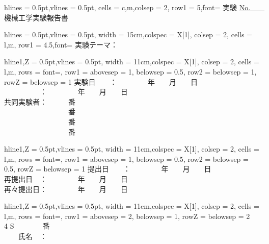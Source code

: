 
\begin{titlepage}
\begin{center}
\begin{tblr}{
  hlines = {0.5pt},vlines = {0.5pt},
  cells = {c,m},colsep = {2\zw},
  row{1} = {5\zh,font=\LARGE\bfseries}
}
  実験 \underline{No.　　}　機械工学実験報告書 \\
\end{tblr}

\vspace*{0.25cm}
\begin{tblr}{
  hlines = {0.5pt},vlines = {0.5pt},
  width = {15cm},colspec = {X[1]},
  colsep = {2\zw},
  cells = {l,m},
  row{1} = {4.5\zh,font=\Large\bfseries}
}
  実験テーマ： \\
\end{tblr}

\vspace*{0.5cm}
\begin{tblr}{
  hline{1,Z} = {0.5pt},vlines = {0.5pt},
  width = {11cm},colspec = {X[1]},
  colsep = {2\zw},
  cells = {l,m},
  rows = {font=\large\bfseries},
  row{1} = {abovesep = 1\zh, belowsep = 0.5\zh},
  row{2} = {belowsep = 1\zh},
  row{Z} = {belowsep = 1\zh}
}
  実験日　　： 　　　　年　　月　　日 \\
  　　　　　： 　　　　年　　月　　日 \\
  共同実験者：　　　番 \\
  　　　　　　　　　番 \\
  　　　　　　　　　番 \\
  　　　　　　　　　番 \\
\end{tblr}

\vspace*{0.25cm}
\begin{tblr}{
  hline{1,Z} = {0.5pt},vlines = {0.5pt},
  width = {11cm},colspec = {X[1]},
  colsep = {2\zw},
  cells = {l,m},
  rows = {font=\large\bfseries},
  row{1} = {abovesep = 1\zh, belowsep = 0.5\zh},
  row{2} = {belowsep = 0.5\zh},
  row{Z} = {belowsep = 1\zh}
}
  提出日　　： 　　　　年　　月　　日 \\
  再提出日　： 　　　　年　　月　　日 \\
  再々提出日： 　　　　年　　月　　日 \\
\end{tblr}

\vspace*{0.25cm}
\begin{tblr}{
  hline{1,Z} = {0.5pt},vlines = {0.5pt},
  width = {11cm},colspec = {X[1]},
  colsep = {2\zw},
  cells = {l,m},
  rows = {font=\large\bfseries},
  row{1} = {abovesep = 2\zh, belowsep = 1\zh},
  row{Z} = {belowsep = 2\zh}
}
  　　4 S　　　　番 \\
  　　氏名　： \\
\end{tblr}


\end{center}
\end{titlepage}
